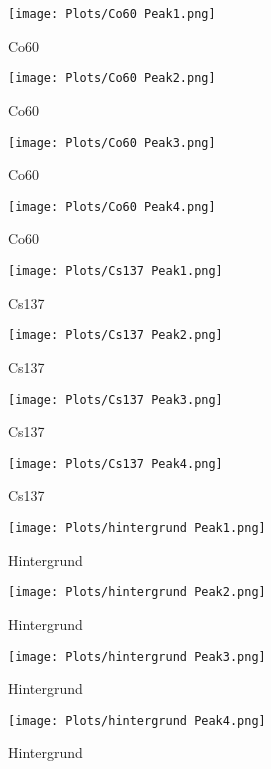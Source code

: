 \documentclass[]{article}
\begin{document}
\begin{figure}
	\centering
	\texttt{[image: Plots/Co60 Peak1.png]}
	\caption{Co60}
\end{figure}
\begin{figure}
	\centering
	\texttt{[image: Plots/Co60 Peak2.png]}
	\caption{Co60}
\end{figure}
\begin{figure}
	\centering
	\texttt{[image: Plots/Co60 Peak3.png]}
	\caption{Co60}
\end{figure}
\begin{figure}
	\centering
	\texttt{[image: Plots/Co60 Peak4.png]}
	\caption{Co60}
\end{figure}
\begin{figure}
	\centering
	\texttt{[image: Plots/Cs137 Peak1.png]}
	\caption[Cs137]{Cs137}
\end{figure}
\begin{figure}
	\centering
	\texttt{[image: Plots/Cs137 Peak2.png]}
	\caption[Cs137]{Cs137}
\end{figure}
\begin{figure}
	\centering
	\texttt{[image: Plots/Cs137 Peak3.png]}
	\caption[Cs137]{Cs137}
\end{figure}
\begin{figure}
	\centering
	\texttt{[image: Plots/Cs137 Peak4.png]}
	\caption[Cs137]{Cs137}
\end{figure}
\begin{figure}
	\centering
	\texttt{[image: Plots/hintergrund Peak1.png]}
	\caption{Hintergrund}
\end{figure}


 \begin{figure}
 	\centering
 	\texttt{[image: Plots/hintergrund Peak2.png]}
 	\caption{Hintergrund}
 \end{figure}
 
 
 \begin{figure}
 	\centering
 	\texttt{[image: Plots/hintergrund Peak3.png]}
 	\caption{Hintergrund}
 \end{figure}
 
 
 \begin{figure}
 	\centering
 	\texttt{[image: Plots/hintergrund Peak4.png]}
 	\caption{Hintergrund}
 \end{figure}
 
\end{document}
